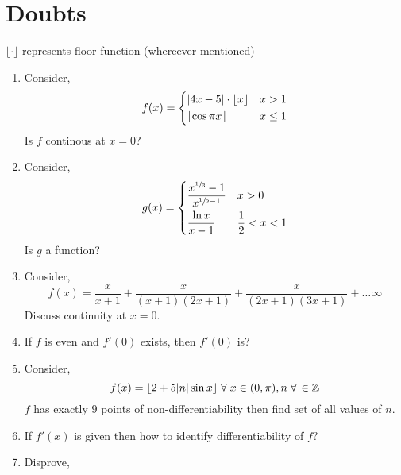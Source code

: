 \documentclass[18pt]{article}
\title{}
\author{}
\date{}
\begin{document}
\maketitle

\section{Doubts}
$\lfloor \cdot \rfloor$ represents floor function (whereever mentioned)
\begin{enumerate}
      \item Consider, $$f(x)=\begin{dcases}
                        |4x-5| \cdot \lfloor x \rfloor & x>1     \\
                        \lfloor \cos \pi x \rfloor     & x \le 1
                  \end{dcases}$$
            Is $f$ continous at $x=0$?
      \item Consider, $$g(x)=\begin{dcases}
                        \dfrac{x^{\sfrac{1}{3}}-1}{x^{\sfrac{1}{2}-1}} & x>0             \\
                        \dfrac{\ln x}{x-1}                             & \frac{1}{2}<x<1
                  \end{dcases}$$
            Is $g$ a function?
      \item Consider, $$f(x)=\frac{x}{x+1}+\frac{x}{(x+1)(2x+1)}+\frac{x}{(2x+1)(3x+1)}+\ldots \infty$$
            Discuss continuity at $x=0$.
      \item If $f$ is even and $f'(0)$ exists, then $f'(0)$ is?
      \item Consider, $$f(x)=\lfloor 2+5|n| \sin x \rfloor \hspace{1mm} \forall \hspace{1mm} x \in (0,\pi), n \hspace{1mm} \forall \hspace{0.5mm}\in \mathbb{Z}$$
            $f$ has exactly $9$ points of non-differentiability then find set of all values of $n$.
      \item If $f'(x)$ is given then how to identify differentiability of $f$?
      \item Disprove,


\end{enumerate}
\end{document}
